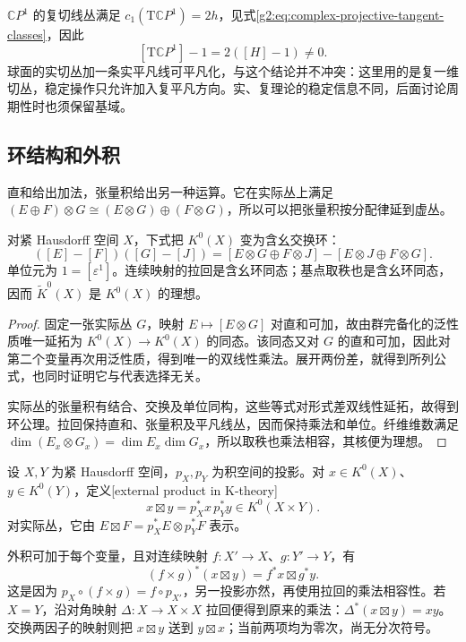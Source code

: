 \begin{example}\label{g2:exm:k-sphere-tangent-line}
	\(\mathbb CP^1\) 的复切线丛满足 \(c_1(\mathrm T\mathbb CP^1)=2h\)，见式\eqref{g2:eq:complex-projective-tangent-classes}，因此
	\[
		[\mathrm T\mathbb CP^1]-1=2([H]-1)\ne0.
	\]
	球面的实切丛加一条实平凡线可平凡化，与这个结论并不冲突：这里用的是复一维切丛，稳定操作只允许加入复平凡方向。实、复理论的稳定信息不同，后面讨论周期性时也须保留基域。
\end{example}

\subsection{环结构和外积}
\label{g2:subsec:2401:04}
直和给出加法，张量积给出另一种运算。它在实际丛上满足 \((E\oplus F)\otimes G\cong(E\otimes G)\oplus(F\otimes G)\)，所以可以把张量积按分配律延到虚丛。

\begin{proposition}\label{g2:prop:k-ring-structure}
	对紧 Hausdorff 空间 \(X\)，下式把 \(K^0(X)\) 变为含幺交换环：
	\[
		([E]-[F])([G]-[J])
		=[E\otimes G\oplus F\otimes J]-[E\otimes J\oplus F\otimes G].
	\]
	单位元为 \(1=[\varepsilon^1]\)。连续映射的拉回是含幺环同态；基点取秩也是含幺环同态，因而 \(\widetilde K^0(X)\) 是 \(K^0(X)\) 的理想。
\end{proposition}
\begin{proof}
	固定一张实际丛 \(G\)，映射 \(E\mapsto[E\otimes G]\) 对直和可加，故由群完备化的泛性质唯一延拓为 \(K^0(X)\to K^0(X)\) 的同态。该同态又对 \(G\) 的直和可加，因此对第二个变量再次用泛性质，得到唯一的双线性乘法。展开两份差，就得到所列公式，也同时证明它与代表选择无关。

	实际丛的张量积有结合、交换及单位同构，这些等式对形式差双线性延拓，故得到环公理。拉回保持直和、张量积及平凡线丛，因而保持乘法和单位。纤维维数满足 \(\dim(E_x\otimes G_x)=\dim E_x\dim G_x\)，所以取秩也乘法相容，其核便为理想。
\end{proof}

\begin{definition}\label{g2:def:k-external-product}
	设 \(X,Y\) 为紧 Hausdorff 空间，\(p_X,p_Y\) 为积空间的投影。对 \(x\in K^0(X)\)、\(y\in K^0(Y)\)，定义[external product in K-theory]
	\[
		x\boxtimes y=p_X^*x\,p_Y^*y\in K^0(X\times Y).
	\]
	对实际丛，它由 \(E\boxtimes F=p_X^*E\otimes p_Y^*F\) 表示。
\end{definition}

外积可加于每个变量，且对连续映射 \(f:X'\to X\)、\(g:Y'\to Y\)，有
\begin{equation}\label{g2:eq:k-external-naturality}
	(f\times g)^*(x\boxtimes y)=f^*x\boxtimes g^*y.
\end{equation}
这是因为 \(p_X\circ(f\times g)=f\circ p_{X'}\)，另一投影亦然，再使用拉回的乘法相容性。若 \(X=Y\)，沿对角映射 \(\Delta:X\to X\times X\) 拉回便得到原来的乘法：\(\Delta^*(x\boxtimes y)=xy\)。交换两因子的映射则把 \(x\boxtimes y\) 送到 \(y\boxtimes x\)；当前两项均为零次，尚无分次符号。

